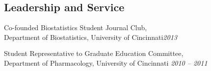 \documentclass[margin,line]{res}
\newenvironment{list3}{
  \begin{list}{}{%
      \setlength{\itemsep}{0in}
      \setlength{\parsep}{0in} \setlength{\parskip}{0in}
      \setlength{\topsep}{0in} \setlength{\partopsep}{0in} 
      \setlength{\leftmargin}{0in}}}{\end{list}}
\begin{document}
\begin{resume}
\section{\sc Leadership and Service} 
\begin{list3} \itemsep 4pt     
\item[] Co-founded Biostatistics Student Journal Club, \\Department of Biostatistics, University of Cincinnati\hfill \textit{2013} 
\item[] Student Representative to Graduate Education Committee, \\Department of Pharmacology, University of Cincinnati \hfill \textit{2010 -- 2011}
\end{list3}


\end{resume}
\end{document}
